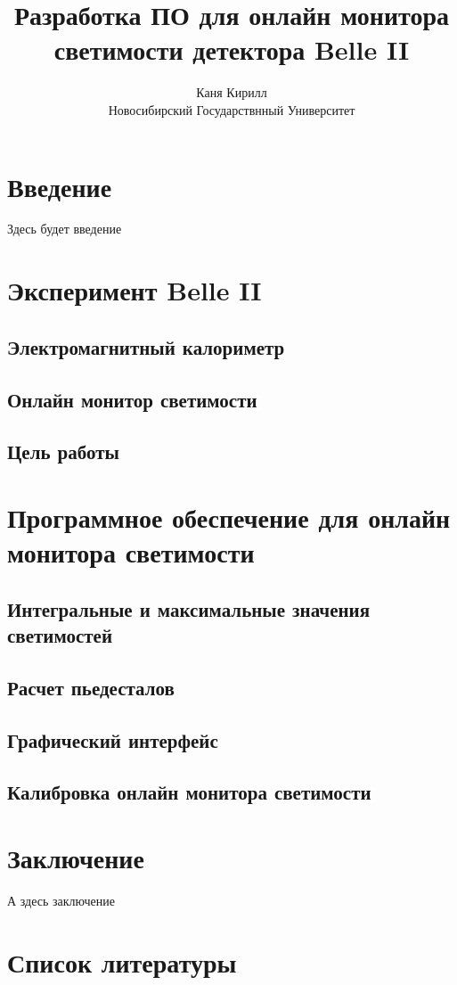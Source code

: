 \documentclass[a4paper, 12pt]{article}
\title{Разработка ПО для онлайн монитора светимости детектора Belle II}
\author{Каня Кирилл\\Новосибирский Государствнный Университет}
\begin{document}
\maketitle
\newpage

\tableofcontents
\newpage

\section*{Введение}
Здесь будет введение

\section{Эксперимент Belle II}
    \subsection{Электромагнитный калориметр}
    
    \subsection{Онлайн монитор светимости}
    
    \subsection{Цель работы}
    

\section{Программное обеспечение для онлайн монитора светимости}
    \subsection{Интегральные и максимальные значения светимостей}
    
    \subsection{Расчет пьедесталов}
    
    \subsection{Графический интерфейс}
    
    \subsection{Калибровка онлайн монитора светимости}
    

\section*{Заключение}
А здесь заключение

\section*{Список литературы}
\end{document}
